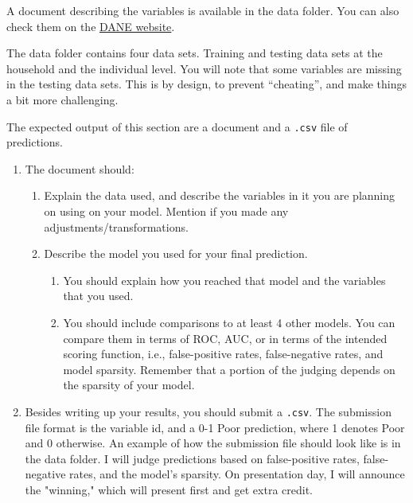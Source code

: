 \documentclass[12pt,onecolumn,A4]{article}
\begin{document}
A document describing the variables is available in the data folder. You can also check them on the  \href{http://microdatos.dane.gov.co/index.php/catalog/608/datafile/F1#page=F2&tab=data-dictionary}{DANE website}.

The data folder contains four data sets. Training and testing data sets at the household and the individual level. You will note that some variables are missing in the testing data sets. This is by design, to prevent ``cheating'', and make things a bit more challenging. 

The expected output of this section are a document and a \texttt{.csv} file of predictions. 

\begin{enumerate}
	\item  The document should:
	\begin{enumerate}
	\item Explain the data used, and describe the variables in it you are planning on using on your model. Mention if you made any adjustments/transformations. 
	\item Describe the model you used for your final prediction. 
  \begin{enumerate}
    \item You should explain how you reached that model and the variables that you used. 
    \item You should include comparisons to at least 4 other models. You can compare them in terms of ROC, AUC, or in terms of the intended scoring function, i.e., false-positive rates, false-negative rates, and model sparsity. Remember that a portion of the judging depends on the sparsity of your model. 
  \end{enumerate}
	\end{enumerate}
	\item Besides writing up your results, you should submit a \texttt{.csv}. The submission file format is the variable id, and a 0-1 Poor prediction, where 1 denotes Poor and 0 otherwise. An example of how the submission file should look like is in the data folder. I will judge predictions based on false-positive rates, false-negative rates, and the model's sparsity. On presentation day, I will announce the "winning," which will present first and get extra credit. 
\end{enumerate}
\end{document}
